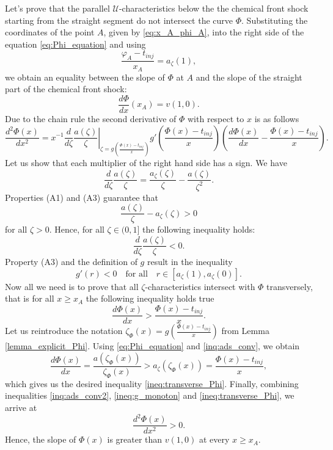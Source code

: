 \documentclass[12pt]{article}
\renewcommand{\geq}{\geqslant}
\theoremstyle{definition}
\begin{document}
Let's prove that the parallel $\mathcal U$-characteristics below the the chemical front shock starting from the straight segment do not intersect the curve $\Phi$.
Substituting the coordinates of the point $A$, given by \eqref{eq:x_A_phi_A}, into the right side of the equation \eqref{eq:Phi_equation} and using 
\[
\frac{\varphi_A - t_{inj}}{x_A} = a_\zeta(1),
\]
we obtain an equality between the slope of $\Phi$ at $A$ and the slope of the straight part of the chemical front shock:
\begin{equation}
\label{eq:dPhi_dx_at_A}
\frac{d\Phi}{d x}(x_A) = v(1, 0).
\end{equation}
Due to the chain rule the second derivative of $\Phi$ with respect to $x$ is as follows
\begin{equation*}
    \frac{d^2\Phi(x)}{d x^2} = 
    x^{-1}\left.\frac{d}{d\zeta}\frac{a(\zeta)}\zeta\right|_{\zeta = g\left(\frac{\Phi(x) - t_{inj}}x\right)}
    g'\left(\frac{\Phi(x) - t_{inj}}x\right)\left(\frac{d\Phi(x)}{dx} - \frac{\Phi(x) - t_{inj}}x\right).
\end{equation*}
Let us show that each multiplier of the right hand side 
has a sign.
We have
\begin{equation}
\label{eq:shock_front_deriv_zeta}
    \frac{d}{d\zeta} \frac{a(\zeta)}\zeta = \frac{a_\zeta(\zeta)}{\zeta} - \frac{a(\zeta)}{\zeta^2}.
\end{equation}
Properties (A1) and (A3) guarantee that 
\begin{equation}
\label{inq:ads_conv}
    \frac{a(\zeta)}\zeta -  a_\zeta(\zeta) > 0
\end{equation}
 for all $\zeta > 0$.
Hence, for all $\zeta \in (0, 1]$ the following inequality holds:
\begin{equation}
\label{inq:ads_conv2}
\frac{d}{d\zeta}\frac{a(\zeta)}\zeta < 0.
\end{equation}
Property (A3) and the definition of $g$ result in the inequality
\begin{equation}
\label{ineq:g_monoton}
g'(r) < 0\quad \text{for all}\quad r \in [a_\zeta(1), a_\zeta(0)].
\end{equation}
Now all we need is to prove that all $\zeta$-characteristics intersect with $\Phi$ transversely, that is for all $x\geq x_A$ the following inequality holds true
\begin{equation}
\label{ineq:transverse_Phi}
    \frac{d\Phi(x)}{dx} > \frac{\Phi(x) - t_{inj}}x.
\end{equation}
Let us reintroduce the notation $\zeta_\Phi(x) = g\left(\frac{\Phi(x) - t_{inj}}{x}\right)$ from Lemma \ref{lemma_explicit_Phi}.
Using \eqref{eq:Phi_equation}  and  \eqref{inq:ads_conv}, we obtain 
\[
\frac{d\Phi(x)}{dx} = \frac{a(\zeta_\Phi(x))}{\zeta_\Phi(x)} > a_\zeta(\zeta_\Phi(x)) = \frac{\Phi(x) - t_{inj}}x,
\]
which gives us the desired inequality \eqref{ineq:transverse_Phi}.
Finally, combining inequalities \eqref{inq:ads_conv2}, \eqref{ineq:g_monoton} and  \eqref{ineq:transverse_Phi}, we arrive at
\begin{equation*}
    \frac{d^2\Phi(x)}{d x^2} > 0.
\end{equation*}
Hence, the slope of $\Phi(x)$ is greater than $v(1, 0)$ at every $x \geq x_A$.
\end{document}
